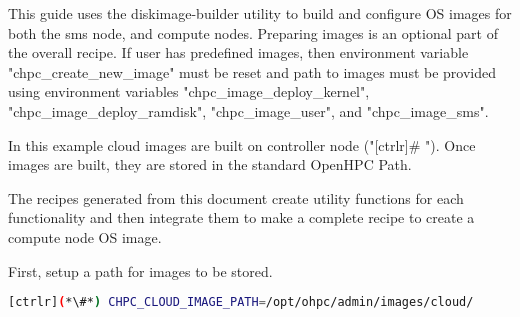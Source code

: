 

   This guide uses the diskimage-builder utility to build and configure OS images for both the sms node, and compute nodes.  Preparing images is an optional part of the overall recipe. If user has predefined images, then environment variable "chpc\_create\_new\_image" must be reset and path to images must be provided using environment variables "chpc\_image\_deploy\_kernel", "chpc\_image\_deploy\_ramdisk", "chpc\_image\_user", and "chpc\_image\_sms". 

	In this example cloud images are built on controller node ("[ctrlr]\# "). Once images are built, they are stored in the standard OpenHPC Path. 
	
	The recipes generated from this document create utility functions for each functionality and then integrate them to make a complete recipe to create a compute node OS image. 
	
	First, setup a path for images to be stored.


\begin{lstlisting}[language=bash,keywords={},upquote=true]
[ctrlr](*\#*) CHPC_CLOUD_IMAGE_PATH=/opt/ohpc/admin/images/cloud/
\end{lstlisting}
